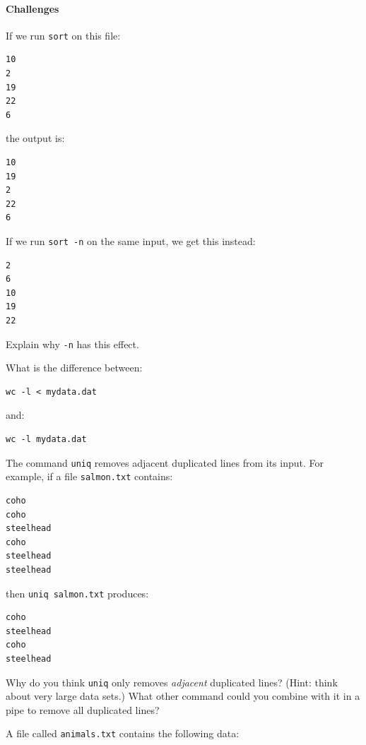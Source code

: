 \documentclass{book}
\begin{document}
\mbox{}\paragraph{Challenges}

\begin{swcenumerate}
\item
  If we run \texttt{sort} on this file:

\begin{verbatim}
10
2
19
22
6
\end{verbatim}

  the output is:

\begin{verbatim}
10
19
2
22
6
\end{verbatim}

  If we run \texttt{sort -n} on the same input, we get this instead:

\begin{verbatim}
2
6
10
19
22
\end{verbatim}

  Explain why \texttt{-n} has this effect.
\item
  What is the difference between:

\begin{verbatim}
wc -l < mydata.dat
\end{verbatim}

  and:

\begin{verbatim}
wc -l mydata.dat
\end{verbatim}
\item
  The command \texttt{uniq} removes adjacent duplicated lines from its
  input. For example, if a file \texttt{salmon.txt} contains:

\begin{verbatim}
coho
coho
steelhead
coho
steelhead
steelhead
\end{verbatim}

  then \texttt{uniq salmon.txt} produces:

\begin{verbatim}
coho
steelhead
coho
steelhead
\end{verbatim}

  Why do you think \texttt{uniq} only removes \emph{adjacent} duplicated
  lines? (Hint: think about very large data sets.) What other command
  could you combine with it in a pipe to remove all duplicated lines?
\item
  A file called \texttt{animals.txt} contains the following data:


\end{swcenumerate}
\end{document}

